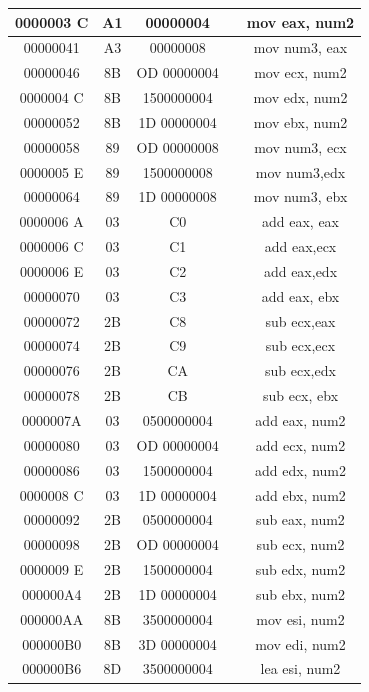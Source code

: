 \documentclass[10pt]{article}
\begin{document}
\begin{center}
\begin{tabular}{|c|c|c|c|c|}
\hline
0000003 C & A1 & 00000004 &  & mov eax, num2 \\
\hline
00000041 & A3 & 00000008 &  & mov num3, eax \\
\hline
00000046 & 8B & OD 00000004 &  & mov ecx, num2 \\
\hline
0000004 C & 8B & 1500000004 &  & mov edx, num2 \\
\hline
00000052 & 8B & 1D 00000004 &  & mov ebx, num2 \\
\hline
00000058 & 89 & OD 00000008 &  & mov num3, ecx \\
\hline
0000005 E & 89 & 1500000008 &  & mov num3,edx \\
\hline
00000064 & 89 & 1D 00000008 &  & mov num3, ebx \\
\hline
0000006 A & 03 & C0 &  & add eax, eax \\
\hline
0000006 C & 03 & C1 &  & add eax,ecx \\
\hline
0000006 E & 03 & C2 &  & add eax,edx \\
\hline
00000070 & 03 & C3 &  & add eax, ebx \\
\hline
00000072 & 2B & C8 &  & sub ecx,eax \\
\hline
00000074 & 2B & C9 &  & sub ecx,ecx \\
\hline
00000076 & 2B & CA &  & sub ecx,edx \\
\hline
00000078 & 2B & CB &  & sub ecx, ebx \\
\hline
0000007A & 03 & 0500000004 &  & add eax, num2 \\
\hline
00000080 & 03 & OD 00000004 &  & add ecx, num2 \\
\hline
00000086 & 03 & 1500000004 &  & add edx, num2 \\
\hline
0000008 C & 03 & 1D 00000004 &  & add ebx, num2 \\
\hline
00000092 & 2B & 0500000004 &  & sub eax, num2 \\
\hline
00000098 & 2B & OD 00000004 &  & sub ecx, num2 \\
\hline
0000009 E & 2B & 1500000004 &  & sub edx, num2 \\
\hline
000000A4 & 2B & 1D 00000004 &  & sub ebx, num2 \\
\hline
000000AA & 8B & 3500000004 &  & mov esi, num2 \\
\hline
000000B0 & 8B & 3D 00000004 &  & mov edi, num2 \\
\hline
000000B6 & 8D & 3500000004 &  & lea esi, num2 \\

\end{tabular}
\end{center}
\end{document}
